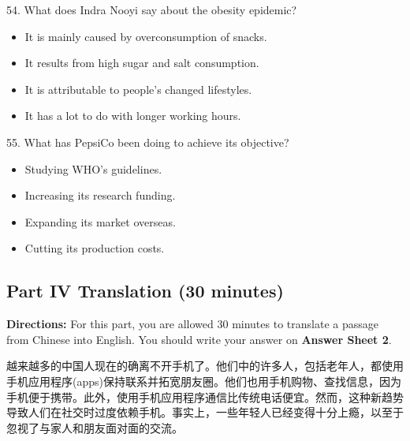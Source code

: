 \documentclass[UTF8,11pt]{ctexart}
\begin{document}
54. What does Indra Nooyi say about the obesity epidemic?


\begin{itemize}[leftmargin=2em,itemsep=.2em,topsep=.4em]\item[A.] It is mainly caused by overconsumption of snacks.
\item[B.] It results from high sugar and salt consumption.
\item[C.] It is attributable to people’s changed lifestyles.
\item[D.] It has a lot to do with longer working hours.
\end{itemize}

55. What has PepsiCo been doing to achieve its objective?


\begin{itemize}[leftmargin=2em,itemsep=.2em,topsep=.4em]\item[A.] Studying WHO’s guidelines.
\item[B.] Increasing its research funding.
\item[C.] Expanding its market overseas.
\item[D.] Cutting its production costs.
\end{itemize}

\subsection*{\textbf{Part} IV \textbf{Translation} \textbf{(30 minutes)}}


\textbf{Directions:} For this part, you are allowed 30 minutes to translate a passage from Chinese into English. You should write your answer on\textbf{ Answer Sheet 2}.


越来越多的中国人现在的确离不开手机了。他们中的许多人，包括老年人，都使用手机应用程序(apps)保持联系并拓宽朋友圈。他们也用手机购物、查找信息，因为手机便于携带。此外，使用手机应用程序通信比传统电话便宜。然而，这种新趋势导致人们在社交时过度依赖手机。事实上，一些年轻人已经变得十分上瘾，以至于忽视了与家人和朋友面对面的交流。
\end{document}
